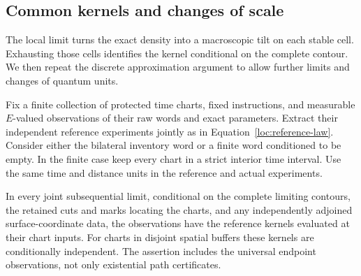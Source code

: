 \subsection{Common kernels and changes of scale}

The local limit turns the exact density into a macroscopic tilt on each
stable cell. Exhausting those cells identifies the kernel conditional on
the complete contour. We then repeat the discrete approximation argument
to allow further limits and changes of quantum units.

\begin{theorem}
\label{loc:fixed-chart-kernels}\label{loc:finite-transfer}
Fix a finite collection of protected time charts, fixed instructions,
and measurable $E$-valued observations of their raw words and exact
parameters.  Extract their independent reference experiments jointly as
in Equation~\eqref{loc:reference-law}.  Consider either the bilateral
inventory word or a finite word conditioned to be empty.  In the finite
case keep every chart in a strict interior time interval.  Use the same
time and distance units in the reference and actual experiments.

In every joint subsequential limit, conditional on the complete limiting
contours, the retained cuts and marks locating the charts, and any
independently adjoined surface-coordinate data, the
observations have the reference kernels evaluated at their chart inputs.
For charts in disjoint spatial buffers these kernels are conditionally
independent.  The assertion includes the universal endpoint
observations, not only existential path certificates.
\end{theorem}
